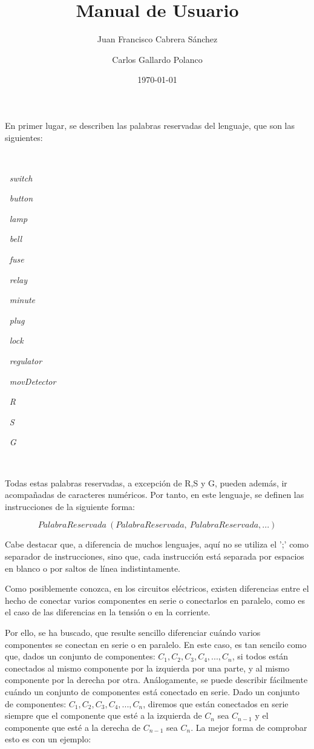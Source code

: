 \documentclass{article}
\author{Juan Francisco Cabrera Sánchez \and Carlos Gallardo Polanco}
\title{Manual de Usuario}
\date{\today}
\begin{document}
\maketitle

En primer lugar, se describen las palabras reservadas del lenguaje, que son las siguientes:

\

\begin{enumerate*}
  \item[$\ $]\textit{switch}
  \item[$\ $]\textit{button}
  \item[$\ $]\textit{lamp}
  \item[$\ $]\textit{bell}
  \item[$\ $]\textit{fuse}
  \item[$\ $]\textit{relay}
  \item[$\ $]\textit{minute}
  \item[$\ $]\textit{plug}
  \item[$\ $]\textit{lock}
  \item[$\ $]\textit{regulator}
  \item[$\ $]\textit{movDetector}
  \item[$\ $]\textit{R}
  \item[$\ $]\textit{S}
  \item[$\ $]\textit{G}
\end{enumerate*}

\

Todas estas palabras reservadas, a excepción de R,S y G, pueden además, ir acompañadas de caracteres numéricos. Por tanto, en este lenguaje, se definen las instrucciones de la siguiente forma:

$$ PalabraReservada \ ( PalabraReservada , \ PalabraReservada , ...) $$

Cabe destacar que, a diferencia de muchos lenguajes, aquí no se utiliza el ';' como separador de instrucciones, sino que, cada instrucción está separada por espacios en blanco o por saltos de línea indistintamente.

Como posiblemente conozca, en los circuitos eléctricos, existen diferencias entre el hecho de conectar varios componentes en serie o conectarlos en paralelo, como es el caso de las diferencias en la tensión o en la corriente.

Por ello, se ha buscado, que resulte sencillo diferenciar cuándo varios componentes se conectan en serie o en paralelo. En este caso, es tan sencilo como que, dados un conjunto de componentes: $C_1,C_2,C_3, C_4,...,C_n$, si todos están conectados al mismo componente por la izquierda por una parte, y al mismo componente por la derecha por otra. Análogamente, se puede describir fácilmente cuándo un conjunto de componentes está conectado en serie. Dado un conjunto de componentes: $C_1,C_2,C_3, C_4,...,C_n$, diremos que están conectados en serie siempre que el componente que esté a la izquierda de $C_{n}$ sea $C_{n-1}$ y el componente que esté a la derecha de $C_{n-1}$ sea $C_{n}$. La mejor forma de comprobar esto es con un ejemplo:
\end{document}

